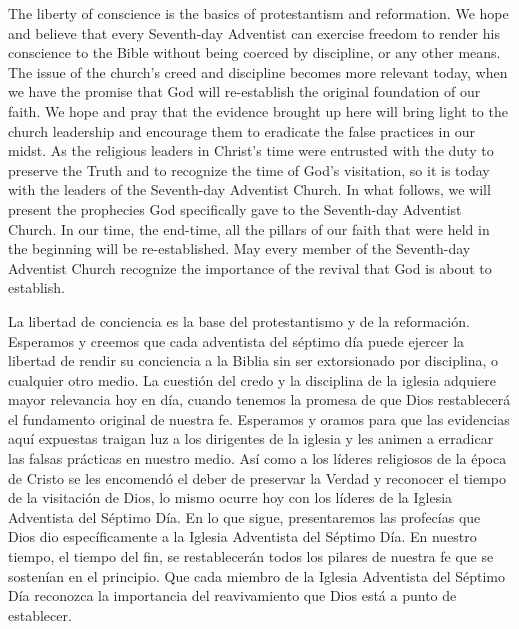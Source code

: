 The liberty of conscience is the basics of protestantism and reformation. We hope and believe that every Seventh-day Adventist can exercise freedom to render his conscience to the Bible without being coerced by discipline, or any other means. The issue of the church's creed and discipline becomes more relevant today, when we have the promise that God will re-establish the original foundation of our faith. We hope and pray that the evidence brought up here will bring light to the church leadership and encourage them to eradicate the false practices in our midst. As the religious leaders in Christ’s time were entrusted with the duty to preserve the Truth and to recognize the time of God’s visitation, so it is today with the leaders of the Seventh-day Adventist Church. In what follows, we will present the prophecies God specifically gave to the Seventh-day Adventist Church. In our time, the end-time, all the pillars of our faith that were held in the beginning will be re-established. May every member of the Seventh-day Adventist Church recognize the importance of the revival that God is about to establish.


La libertad de conciencia es la base del protestantismo y de la reformación. Esperamos y creemos que cada adventista del séptimo día puede ejercer la libertad de rendir su conciencia a la Biblia sin ser extorsionado por disciplina, o cualquier otro medio. La cuestión del credo y la disciplina de la iglesia adquiere mayor relevancia hoy en día, cuando tenemos la promesa de que Dios restablecerá el fundamento original de nuestra fe. Esperamos y oramos para que las evidencias aquí expuestas traigan luz a los dirigentes de la iglesia y les animen a erradicar las falsas prácticas en nuestro medio. Así como a los líderes religiosos de la época de Cristo se les encomendó el deber de preservar la Verdad y reconocer el tiempo de la visitación de Dios, lo mismo ocurre hoy con los líderes de la Iglesia Adventista del Séptimo Día. En lo que sigue, presentaremos las profecías que Dios dio específicamente a la Iglesia Adventista del Séptimo Día. En nuestro tiempo, el tiempo del fin, se restablecerán todos los pilares de nuestra fe que se sostenían en el principio. Que cada miembro de la Iglesia Adventista del Séptimo Día reconozca la importancia del reavivamiento que Dios está a punto de establecer.





% 
